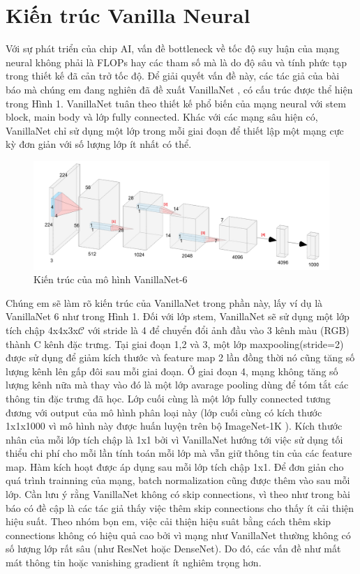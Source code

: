 \documentclass[a4paper,12pt]{article}
\begin{document}
\section{Kiến trúc Vanilla Neural}
Với sự phát triển của chip AI, vấn đề bottleneck về tốc độ suy luận của mạng neural không phải là FLOPs hay các tham số mà là do độ sâu và tính phức tạp trong thiết kế 
đã cản trở tốc độ. Để giải quyết vấn đề này, các tác giả của bài báo mà chúng em đang nghiên đã đề xuất VanillaNet \cite{chen2023vanillanetpowerminimalismdeep}, có cấu trúc được thể hiện trong Hình 1. VanillaNet tuân theo thiết kế phổ biến của mạng neural với stem block, main body và lớp fully connected. Khác với các mạng sâu hiện có, VanillaNet chỉ sử dụng một lớp trong mỗi giai đoạn để thiết lập một mạng cực kỳ đơn giản với số lượng lớp ít nhất có thể.
\begin{figure}[h!]
\centering
\includegraphics[width=15cm]{vanillanet-6-structure.png}
\caption{Kiến trúc của mô hình VanillaNet-6}
\end{figure}
\newpage
Chúng em sẽ làm rõ kiến trúc của VanillaNet trong phần này, lấy ví dụ là VanillaNet 6 như trong Hình 1. Đối với lớp stem, VanillaNet sẽ sử dụng một lớp tích chập 4x4x3x$\mathcal{C}$ với stride là 4 để chuyển đổi ảnh đầu vào 3 kênh màu (RGB) thành C kênh đặc trưng. Tại giai đoạn 1,2 và 3, một lớp maxpooling(stride=2) được sử dụng để giảm kích thước và feature map 2 lần đồng thời nó cũng tăng số lượng kênh lên gấp đôi sau mỗi giai đoạn. Ở giai đoạn 4, mạng không tăng số lượng kênh nữa mà thay vào đó là một lớp avarage pooling dùng để tóm tắt các thông tin đặc trưng đã học. Lớp cuối cùng là một lớp fully connected tương đương với output của mô hình phân loại này (lớp cuối cùng có kích thước 1x1x1000 vì mô hình này được huấn luyện trên bộ ImageNet-1K \cite{imagenet}). Kích thước nhân của mỗi lớp tích chập là 1x1 bởi vì VanillaNet hướng tới việc sử dụng tối thiểu chi phí cho mỗi lần tính toán mỗi lớp mà vẫn giữ thông tin của các feature map. Hàm kích hoạt được áp dụng sau mỗi lớp tích chập 1x1. Để đơn giản cho quá trình trainning của mạng, batch normalization cũng được thêm vào sau mỗi lớp. Cần lưu ý rằng VanillaNet không có skip connections, vì theo như trong bài báo có đề cập là các tác giả thấy việc thêm skip connections cho thấy ít cải thiện hiệu suất. Theo nhóm bọn em, việc cải thiện hiệu suât bằng cách thêm skip connections không có hiệu quả cao bởi vì mạng như VanillaNet thường không có số lượng lớp rất sâu (như ResNet hoặc DenseNet). Do đó, các vấn đề như mất mát thông tin hoặc vanishing gradient ít nghiêm trọng hơn.
\end{document}
